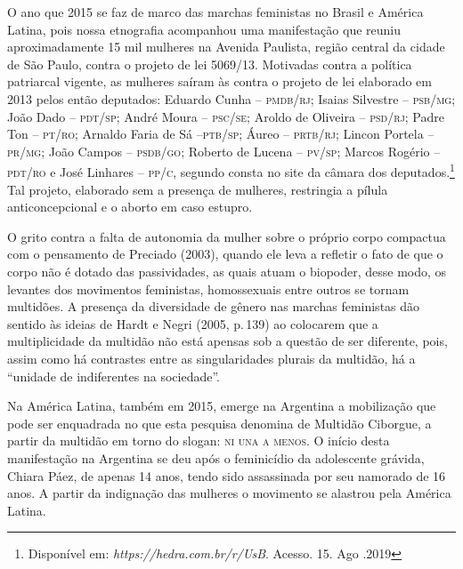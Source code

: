 O ano que 2015 se faz de marco das marchas feministas no Brasil e
América Latina, pois nossa etnografia acompanhou uma manifestação que
reuniu aproximadamente 15 mil mulheres na Avenida Paulista, região
central da cidade de São Paulo, contra o projeto de lei 5069/13.
Motivadas contra a política patriarcal vigente, as mulheres saíram às
contra o projeto de lei elaborado em 2013 pelos então deputados:
Eduardo Cunha --
\textsc{pmdb}/\textsc{rj}; Isaias
Silvestre -- \textsc{psb}/\textsc{mg};
João Dado -- \textsc{pdt}/\textsc{sp};
André Moura -- \textsc{psc}/\textsc{se};
Aroldo de Oliveira -- \textsc{psd}/\textsc{rj};
Padre Ton -- \textsc{pt}/\textsc{ro};
Arnaldo Faria de Sá --\textsc{ptb}/\textsc{sp}; Áureo -- \textsc{prtb}/\textsc{rj}; Lincon Portela --\textsc{pr}/\textsc{mg};
João Campos -- \textsc{psdb}/\textsc{go}; Roberto de Lucena -- \textsc{pv}/\textsc{sp}; Marcos Rogério --
\textsc{pdt}/\textsc{ro} e José Linhares -- \textsc{pp}/\textsc{c}, segundo consta no site da câmara dos
deputados.\footnote{Disponível em:
  \emph{https://hedra.com.br/r/UsB}.
  Acesso. 15. Ago .2019} Tal projeto, elaborado sem a presença de
mulheres, restringia a pílula anticoncepcional e o aborto em caso
estupro.

O grito contra a falta de autonomia da mulher sobre o próprio corpo
compactua com o pensamento de Preciado (2003), quando ele leva a
refletir o fato de que o corpo não é dotado das passividades, as quais
atuam o biopoder, desse modo, os levantes dos movimentos feministas,
homossexuais entre outros se tornam multidões. A presença da diversidade
de gênero nas marchas feministas dão sentido às ideias de Hardt e Negri
(2005, p.\,139) ao colocarem que a multiplicidade da multidão não está
apensas sob a questão de ser diferente, pois, assim como há contrastes
entre as singularidades plurais da multidão, há a ``unidade de
indiferentes na sociedade''.

Na América Latina, também em 2015, emerge na Argentina a mobilização que
pode ser enquadrada no que esta pesquisa denomina de Multidão Ciborgue,
a partir da multidão em torno do slogan: \textsc{ni una a menos}. O início desta
manifestação na Argentina se deu após o feminicídio da adolescente
grávida, Chiara Páez, de apenas 14 anos, tendo sido assassinada por seu
namorado de 16 anos. A partir da indignação das mulheres o movimento se
alastrou pela América Latina.

